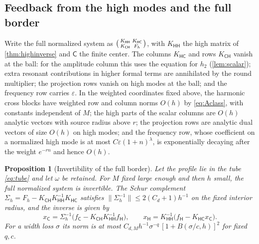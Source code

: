 \documentclass[11pt]{amsart}
\numberwithin{equation}{section}
\newtheorem{proposition}[theorem]{Proposition}
\theoremstyle{definition}
\theoremstyle{remark}
\newcommand{\eps}{\varepsilon}
\newcommand{\norm}[1]{\lVert #1\rVert}
\begin{document}
\subsection{Feedback from the high modes and the full border}
Write the full normalized system as $\begin{psmallmatrix}K_{\mathsf{HH}}&K_{\mathsf{HC}}\\K_{\mathsf{CH}}&F_h\end{psmallmatrix}$, with $K_{\mathsf{HH}}$ the high matrix of \cref{thm:highinverse} and $\mathsf C$ the finite center. The columns $K_{\mathsf{HC}}$ and rows $K_{\mathsf{CH}}$ vanish at the ball: for the amplitude column this uses the equation for $h_2$ (\cref{lem:scalar}); extra resonant contributions in higher formal terms are annihilated by the round multiplier; the projection rows vanish on high modes at the ball; and the frequency row carries $\eps$. In the weighted coordinates fixed above, the harmonic cross blocks have weighted row and column norms $O(h)$ by \eqref{eq:Aclass}, with constants independent of $M$; the high parts of the scalar columns are $O(h)$ analytic vectors with source radius above $r$; the projection rows are analytic dual vectors of size $O(h)$ on high modes; and the frequency row, whose coefficient on a normalized high mode is at most $C\eps(1+n)^{\lambda}$, is exponentially decaying after the weight $e^{-rn}$ and hence $O(h)$.

\begin{proposition}[Invertibility of the full border]\label{prop:border}
Let the profile lie in the tube \eqref{eq:tube} and let $\omega$ be retained. For $M$ fixed large enough and then $h$ small, the full normalized system is invertible. The Schur complement $\Sigma_h=F_h-K_{\mathsf{CH}}K_{\mathsf{HH}}^{-1}K_{\mathsf{HC}}$ satisfies $\norm{\Sigma_h^{-1}}\le2(C_d+1)h^{-1}$ on the fixed interior radius, and the inverse is given by
\[
x_{\mathsf C}=\Sigma_h^{-1}\bigl(f_{\mathsf C}-K_{\mathsf{CH}}K_{\mathsf{HH}}^{-1}f_{\mathsf H}\bigr),\qquad x_{\mathsf H}=K_{\mathsf{HH}}^{-1}\bigl(f_{\mathsf H}-K_{\mathsf{HC}}x_{\mathsf C}\bigr).
\]
For a width loss $\sigma$ its norm is at most $C_{d,M}h^{-1}\sigma^{-q}\,[1+B(\sigma/c,h)]^2$ for fixed $q,c$.
\end{proposition}
\end{document}
